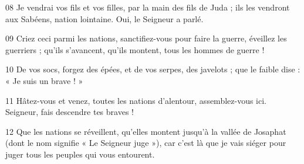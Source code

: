 
08 Je vendrai vos fils et vos filles, par la main des fils de Juda ; ils les vendront aux Sabéens, nation lointaine. Oui, le Seigneur a parlé.

09 Criez ceci parmi les nations, sanctifiez-vous pour faire la guerre, éveillez les guerriers ; qu’ils s’avancent, qu’ils montent, tous les hommes de guerre !

10 De vos socs, forgez des épées, et de vos serpes, des javelots ; que le faible dise : « Je suis un brave ! »

11 Hâtez-vous et venez, toutes les nations d’alentour, assemblez-vous ici. Seigneur, fais descendre tes braves !

12 Que les nations se réveillent, qu’elles montent jusqu’à la vallée de Josaphat (dont le nom signifie « Le Seigneur juge »), car c’est là que je vais siéger pour juger tous les peuples qui vous entourent.